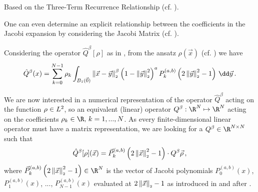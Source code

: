 Based on the Three-Term Recurrence Relationship (cf. ).

One can even determine an explicit relationship between the coefficients
in the Jacobi expansion by considering the Jacobi Matrix (cf. ).

\pagebreak
Considering the operator $\hat{Q}^\beta[\rho]$ as in , from the ansatz $\rho(\vec{x})$ (cf. ) we have
\begin{equation}
  \hat{Q}^{\beta}(x) = \sum_{k=0}^{N-1} \rho_{k} \int_{B_1(\vec{0})} \norm{\vec{x}-\vec{y}}^{\beta} \weight{y}\jacobi{y} \,\dd\vec{y}\,.
  \label{eq:theorem216-in-derivation}
\end{equation}

We are now interested in a numerical representation of the operator $\hat{Q}^\beta$ acting on the function $\rho \in L^2$, so an equivalent (linear) operator $Q^\beta: \R^N \mapsto \R^N$ acting on the coefficients $\rho_k \in \R,\, k = 1, ..., N$.
As every finite-dimensional linear operator must have a matrix representation, we are looking for a $Q^\beta \in \R^{N \times N}$ such that
$$\hat{Q}^\beta[\rho](\vec{x}) = \vec{P}_{k}^{(a, b)}\left(2 \left\lVert\vec{x}\right\rVert_{\scriptscriptstyle 2}^2 - 1\right) \cdot Q^\beta \vec{\rho}\,,$$
where $\jacobivec{x} \in \R^N$ is the vector of Jacobi polynomials $P^{(a, b)}_0(x)$, $P^{(a, b)}_1(x)$, ..., $P^{(a, b)}_{N-1}(x)$ evaluated at $2\left\lVert\vec{x}\right\rVert_{\scriptscriptstyle 2} - 1$ as introduced in and after .

